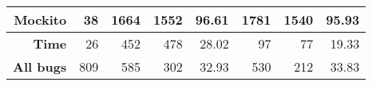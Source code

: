 \begin{table*}[]
{\begin{tabular}{|r|r|rrr|rrr|}
            \textbf{Mockito}                        & 38                                     & \multicolumn{1}{r|}{1664} & \multicolumn{1}{r|}{1552} & 96.61                 & \multicolumn{1}{r|}{1781} & \multicolumn{1}{r|}{1540} & 95.93                 \\ \hline
            \textbf{Time}                           & 26                                     & \multicolumn{1}{r|}{452}  & \multicolumn{1}{r|}{478}  & 28.02                 & \multicolumn{1}{r|}{97}   & \multicolumn{1}{r|}{77}   & 19.33                 \\ \hline
            \hline
            \textbf{All bugs}                       & 809                                    & \multicolumn{1}{r|}{585}  & \multicolumn{1}{r|}{302}  & 32.93                 & \multicolumn{1}{r|}{530}  & \multicolumn{1}{r|}{212}  & 33.83                 \\ \hline
        \end{tabular}
    }
\end{table*}
